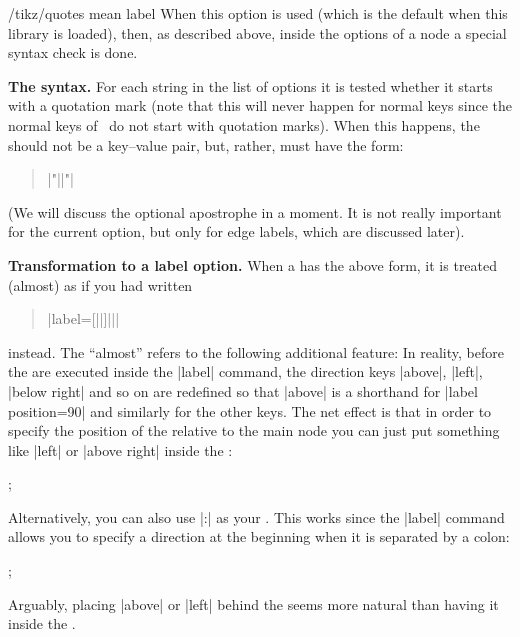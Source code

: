 \begin{key}{/tikz/quotes mean label}
    When this option is used (which is the default when this library is
    loaded), then, as described above, inside the options of a node a special
    syntax check is done.

    \medskip
    \noindent\textbf{The syntax.}
    For each string in the list of options it is tested whether it starts with
    a quotation mark (note that this will never happen for normal keys since
    the normal keys of \tikzname\ do not start with quotation marks). When this
    happens, the  should not be a key--value pair, but, rather,
    must have the form:
    \begin{quote}
        |"||"|
    \end{quote}

    (We will discuss the optional apostrophe in a moment. It is not really
    important for the current option, but only for edge labels, which are
    discussed later).

    \medskip
    \noindent\textbf{Transformation to a label option.}
    When a  has the above form, it is treated (almost) as if you
    had written
    \begin{quote}
        |label={[||]||}|
    \end{quote}
    instead. The ``almost'' refers to the following additional feature: In
    reality, before the  are executed inside the |label| command,
    the direction keys |above|, |left|, |below right| and so on are redefined
    so that |above| is a shorthand for |label position=90| and similarly for
    the other keys. The net effect is that in order to specify the position of
    the  relative to the main node you can just put something like
    |left| or |above right| inside the :
\begin{codeexample}[preamble={\usetikzlibrary{quotes}}]
\tikz
  ;
\end{codeexample}

    Alternatively, you can also use |:| as
    your . This works since the |label| command allows you to
    specify a direction at the beginning when it is separated by a colon:
\begin{codeexample}[preamble={\usetikzlibrary{quotes}}]
\tikz
  ;
\end{codeexample}
    Arguably, placing |above| or |left| behind the  seems more
    natural than having it inside the .


\end{key}

